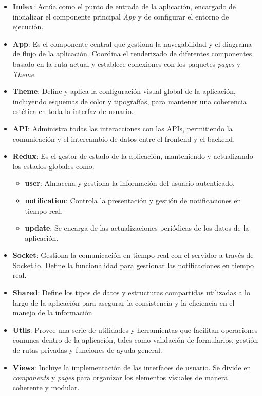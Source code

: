 \begin{itemize}
    \item \textbf{Index}: Actúa como el punto de entrada de la aplicación, encargado de inicializar el componente principal \textit{App} y de configurar el entorno de ejecución.
    \item \textbf{App}: Es el componente central que gestiona la navegabilidad y el diagrama de flujo de la aplicación. Coordina el renderizado de diferentes componentes basado en la ruta actual y establece conexiones con los paquetes \textit{pages} y \textit{Theme}.
    \item \textbf{Theme}: Define y aplica la configuración visual global de la aplicación, incluyendo esquemas de color y tipografías, para mantener una coherencia estética en toda la interfaz de usuario.
    \item \textbf{API}: Administra todas las interacciones con las APIs, permitiendo la comunicación y el intercambio de datos entre el frontend y el backend.
    \item \textbf{Redux}: Es el gestor de estado de la aplicación, manteniendo y actualizando los estados globales como:
    \begin{itemize}
        \item \textbf{user}: Almacena y gestiona la información del usuario autenticado.
        \item \textbf{notification}: Controla la presentación y gestión de notificaciones en tiempo real.
        \item \textbf{update}: Se encarga de las actualizaciones periódicas de los datos de la aplicación.
    \end{itemize}
    \item \textbf{Socket}: Gestiona la comunicación en tiempo real con el servidor a través de Socket.io. Define la funcionalidad para gestionar las notificaciones en tiempo real.
    \item \textbf{Shared}: Define los tipos de datos y estructuras compartidas utilizadas a lo largo de la aplicación para asegurar la consistencia y la eficiencia en el manejo de la información.
    \item \textbf{Utils}: Provee una serie de utilidades y herramientas que facilitan operaciones comunes dentro de la aplicación, tales como validación de formularios, gestión de rutas privadas y funciones de ayuda general.
    \item \textbf{Views}: Incluye la implementación de las interfaces de usuario. Se divide en \textit{components} y \textit{pages} para organizar los elementos visuales de manera coherente y modular.


\end{itemize}
